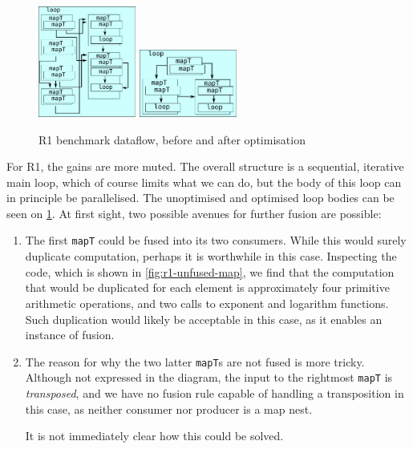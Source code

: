 \begin{figure}
\begin{center}
\includegraphics[width=3.2cm]{img/HiperfitEgCos-unfused.pdf}
\hspace{1cm}
\includegraphics[width=3.2cm]{img/HiperfitEgCos-fused.pdf}
\end{center}
\caption{R1 benchmark dataflow, before and after optimisation}
\label{fig:r1-dataflow}
\end{figure}

For R1, the gains are more muted.  The overall structure is a
sequential, iterative main loop, which of course limits what we can
do, but the body of this loop can in principle be parallelised.  The
unoptimised and optimised loop bodies can be seen on
\cref{fig:r1-dataflow}.  At first sight, two possible avenues for
further fusion are possible:

\begin{enumerate}
\item The first \texttt{mapT} could be fused into its two consumers.
  While this would surely duplicate computation, perhaps it is
  worthwhile in this case.  Inspecting the code, which is shown in
  \cref{fig:r1-unfused-map}, we find that the computation that would
  be duplicated for each element is approximately four primitive
  arithmetic operations, and two calls to exponent and logarithm
  functions.  Such duplication would likely be acceptable in this
  case, as it enables an instance of fusion.

\item The reason for why the two latter \texttt{mapT}s are not fused
  is more tricky.  Although not expressed in the diagram, the input to
  the rightmost \texttt{mapT} is \textit{transposed}, and we have no
  fusion rule capable of handling a transposition in this case, as
  neither consumer nor producer is a map nest.

  It is not immediately clear how this could be solved.
\end{enumerate}

